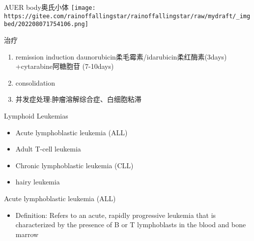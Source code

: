 \documentclass[
  ignorenonframetext,
]{beamer}
\providecommand{\tightlist}{%
  \setlength{\itemsep}{0pt}\setlength{\parskip}{0pt}}
\begin{document}
\begin{frame}
\begin{block}{AUER body奥氏小体}
\protect\hypertarget{auer-bodyux5965ux6c0fux5c0fux4f53}{}
\texttt{[image: https://gitee.com/rainoffallingstar/rainoffallingstar/raw/mydraft/\_imgbed/202208071754106.png]}
\end{block}
\end{frame}

\begin{frame}
\begin{block}{治疗}
\protect\hypertarget{ux6cbbux7597-6}{}
\begin{enumerate}
\item
  remission induction daunorubicin柔毛霉素/idarubicin柔红酶素(3days)
  +cytarabine阿糖胞苷 (7-10days)
\item
  consolidation
\item
  并发症处理:肿瘤溶解综合症、白细胞粘滞
\end{enumerate}
\end{block}
\end{frame}

\begin{frame}
\begin{block}{Lymphoid Leukemias}
\protect\hypertarget{lymphoid-leukemias}{}
\begin{itemize}
\item
  Acute lymphoblastic leukemia (ALL)
\item
  Adult T-cell leukemia
\item
  Chronic lymphoblastic leukemia (CLL)
\item
  hairy leukemia
\end{itemize}
\end{block}
\end{frame}

\begin{frame}
\begin{block}{Acute lymphoblastic leukemia (ALL)}
\protect\hypertarget{acute-lymphoblastic-leukemia-all}{}
\begin{itemize}
\tightlist
\item
  Definition: Refers to an acute, rapidly progressive leukemia that is
  characterized by the presence of B or T lymphoblasts in the blood and
  bone marrow
\end{itemize}
\end{block}
\end{frame}
\end{document}
